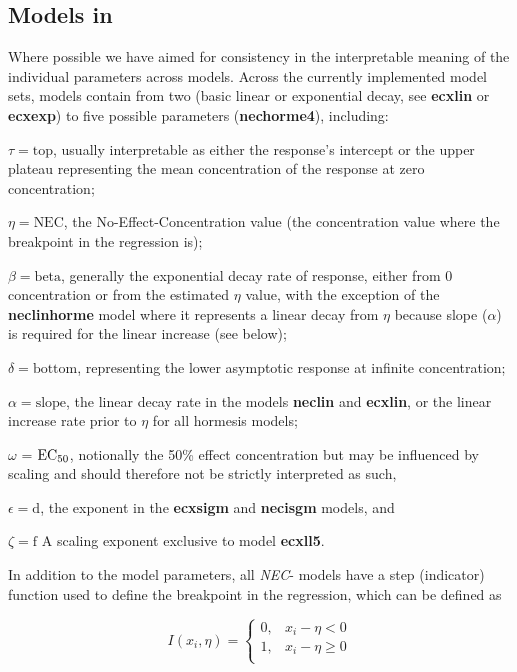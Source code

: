 \documentclass[
  shortnames]{jss}
\begin{document}
\subsection[Models in bayesnec]{Models in }\label{mdbnc}

Where possible we have aimed for consistency in the interpretable meaning of the individual parameters across models. Across the currently implemented model sets, models contain from two (basic linear or exponential decay, see \textbf{ecxlin} or \textbf{ecxexp}) to five possible parameters (\textbf{nechorme4}), including:

\(\tau = \text{top}\), usually interpretable as either the response's intercept or the upper plateau representing the mean concentration of the response at zero concentration;

\(\eta = \text{NEC}\), the No-Effect-Concentration value (the concentration value where the breakpoint in the regression is);

\(\beta = \text{beta}\), generally the exponential decay rate of response, either from 0 concentration or from the estimated \(\eta\) value, with the exception of the \textbf{neclinhorme} model where it represents a linear decay from \(\eta\) because slope (\(\alpha\)) is required for the linear increase (see below);

\(\delta = \text{bottom}\), representing the lower asymptotic response at infinite concentration;

\(\alpha = \text{slope}\), the linear decay rate in the models \textbf{neclin} and \textbf{ecxlin}, or the linear increase rate prior to \(\eta\) for all hormesis models;

\(\omega\) = \(\text{EC\textsubscript{50}}\), notionally the 50\% effect concentration but may be influenced by scaling and should therefore not be strictly interpreted as such,

\(\epsilon = \text{d}\), the exponent in the \textbf{ecxsigm} and \textbf{necisgm} models, and

\(\zeta = \text{f}\) A scaling exponent exclusive to model \textbf{ecxll5}.

In addition to the model parameters, all \emph{NEC}- models have a step (indicator) function used to define the breakpoint in the regression, which can be defined as

\[
I(x_i, \eta) = \begin{cases} 
      0, & x_i - \eta < 0 \\
      1, & x_i - \eta \geq 0 \\
   \end{cases}
\]
\end{document}

